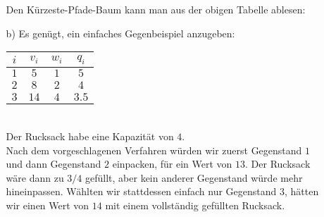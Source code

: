 \documentclass [a4paper,11pt]{article}
\begin{document}
\begin{enumerate}
\begin{enumerate}
            Den Kürzeste-Pfade-Baum kann man aus der obigen Tabelle ablesen:

            \begin{figure}[h]
                \centering
            \end{figure}
    \item[b)]
        Es genügt, ein einfaches Gegenbeispiel anzugeben:\\
        \begin{tabular}{c|c|c|c}
            $i$ & $v_i$ & $w_i$ & $q_i$ \\
            \hline
            $1$ & $5$ & $1$ & $5$ \\
            $2$ & $8$ & $2$ & $4$ \\
            $3$ & $14$ & $4$ & $3.5$
        \end{tabular}
        \\
        Der Rucksack habe eine Kapazität von $4$.\\
        Nach dem vorgeschlagenen Verfahren würden wir zuerst Gegenstand $1$ und dann Gegenstand $2$ einpacken, für ein
        Wert von $13$. Der Rucksack wäre dann zu $3/4$ gefüllt, aber kein anderer Gegenstand würde mehr hineinpassen. Wählten wir stattdessen einfach nur
        Gegenstand $3$, hätten wir einen Wert von $14$ mit einem vollständig gefüllten Rucksack.


\end{enumerate}
\end{enumerate}
\end{document}
